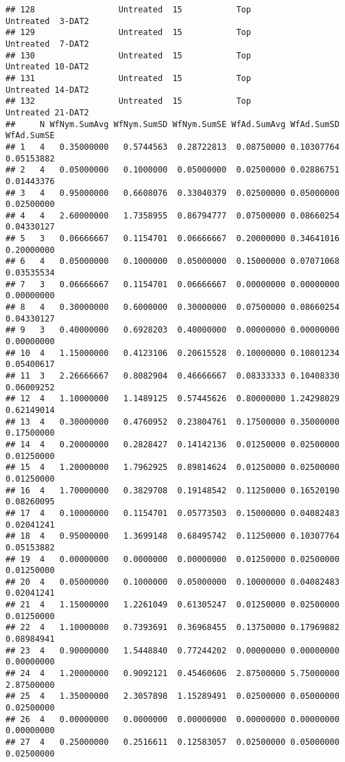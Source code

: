 \documentclass[
]{article}
\begin{document}
\begin{verbatim}
## 128                 Untreated  15           Top              Untreated  3-DAT2
## 129                 Untreated  15           Top              Untreated  7-DAT2
## 130                 Untreated  15           Top              Untreated 10-DAT2
## 131                 Untreated  15           Top              Untreated 14-DAT2
## 132                 Untreated  15           Top              Untreated 21-DAT2
##     N WfNym.SumAvg WfNym.SumSD WfNym.SumSE WfAd.SumAvg WfAd.SumSD WfAd.SumSE
## 1   4   0.35000000   0.5744563  0.28722813  0.08750000 0.10307764 0.05153882
## 2   4   0.05000000   0.1000000  0.05000000  0.02500000 0.02886751 0.01443376
## 3   4   0.95000000   0.6608076  0.33040379  0.02500000 0.05000000 0.02500000
## 4   4   2.60000000   1.7358955  0.86794777  0.07500000 0.08660254 0.04330127
## 5   3   0.06666667   0.1154701  0.06666667  0.20000000 0.34641016 0.20000000
## 6   4   0.05000000   0.1000000  0.05000000  0.15000000 0.07071068 0.03535534
## 7   3   0.06666667   0.1154701  0.06666667  0.00000000 0.00000000 0.00000000
## 8   4   0.30000000   0.6000000  0.30000000  0.07500000 0.08660254 0.04330127
## 9   3   0.40000000   0.6928203  0.40000000  0.00000000 0.00000000 0.00000000
## 10  4   1.15000000   0.4123106  0.20615528  0.10000000 0.10801234 0.05400617
## 11  3   2.26666667   0.8082904  0.46666667  0.08333333 0.10408330 0.06009252
## 12  4   1.10000000   1.1489125  0.57445626  0.80000000 1.24298029 0.62149014
## 13  4   0.30000000   0.4760952  0.23804761  0.17500000 0.35000000 0.17500000
## 14  4   0.20000000   0.2828427  0.14142136  0.01250000 0.02500000 0.01250000
## 15  4   1.20000000   1.7962925  0.89814624  0.01250000 0.02500000 0.01250000
## 16  4   1.70000000   0.3829708  0.19148542  0.11250000 0.16520190 0.08260095
## 17  4   0.10000000   0.1154701  0.05773503  0.15000000 0.04082483 0.02041241
## 18  4   0.95000000   1.3699148  0.68495742  0.11250000 0.10307764 0.05153882
## 19  4   0.00000000   0.0000000  0.00000000  0.01250000 0.02500000 0.01250000
## 20  4   0.05000000   0.1000000  0.05000000  0.10000000 0.04082483 0.02041241
## 21  4   1.15000000   1.2261049  0.61305247  0.01250000 0.02500000 0.01250000
## 22  4   1.10000000   0.7393691  0.36968455  0.13750000 0.17969882 0.08984941
## 23  4   0.90000000   1.5448840  0.77244202  0.00000000 0.00000000 0.00000000
## 24  4   1.20000000   0.9092121  0.45460606  2.87500000 5.75000000 2.87500000
## 25  4   1.35000000   2.3057898  1.15289491  0.02500000 0.05000000 0.02500000
## 26  4   0.00000000   0.0000000  0.00000000  0.00000000 0.00000000 0.00000000
## 27  4   0.25000000   0.2516611  0.12583057  0.02500000 0.05000000 0.02500000

\end{verbatim}
\end{document}
